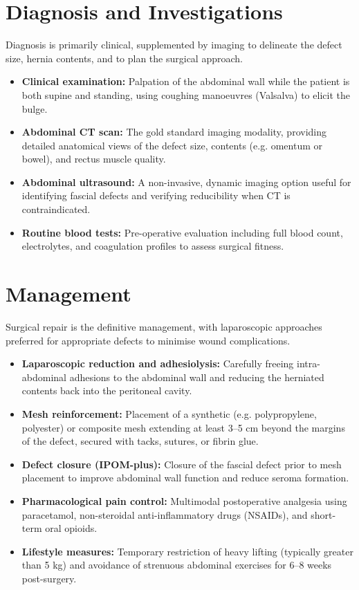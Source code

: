 \section*{Diagnosis and Investigations}
Diagnosis is primarily clinical, supplemented by imaging to delineate the defect size, hernia contents, and to plan the surgical approach.
\begin{itemize}
    \item \textbf{Clinical examination:} Palpation of the abdominal wall while the patient is both supine and standing, using coughing manoeuvres (Valsalva) to elicit the bulge.
    \item \textbf{Abdominal CT scan:} The gold standard imaging modality, providing detailed anatomical views of the defect size, contents (e.g. omentum or bowel), and rectus muscle quality.
    \item \textbf{Abdominal ultrasound:} A non-invasive, dynamic imaging option useful for identifying fascial defects and verifying reducibility when CT is contraindicated.
    \item \textbf{Routine blood tests:} Pre-operative evaluation including full blood count, electrolytes, and coagulation profiles to assess surgical fitness.
\end{itemize}

\section*{Management}
Surgical repair is the definitive management, with laparoscopic approaches preferred for appropriate defects to minimise wound complications.
\begin{itemize}
    \item \textbf{Laparoscopic reduction and adhesiolysis:} Carefully freeing intra-abdominal adhesions to the abdominal wall and reducing the herniated contents back into the peritoneal cavity.
    \item \textbf{Mesh reinforcement:} Placement of a synthetic (e.g. polypropylene, polyester) or composite mesh extending at least 3--5 cm beyond the margins of the defect, secured with tacks, sutures, or fibrin glue.
    \item \textbf{Defect closure (IPOM-plus):} Closure of the fascial defect prior to mesh placement to improve abdominal wall function and reduce seroma formation.
    \item \textbf{Pharmacological pain control:} Multimodal postoperative analgesia using paracetamol, non-steroidal anti-inflammatory drugs (NSAIDs), and short-term oral opioids.
    \item \textbf{Lifestyle measures:} Temporary restriction of heavy lifting (typically greater than 5 kg) and avoidance of strenuous abdominal exercises for 6--8 weeks post-surgery.
\end{itemize}

